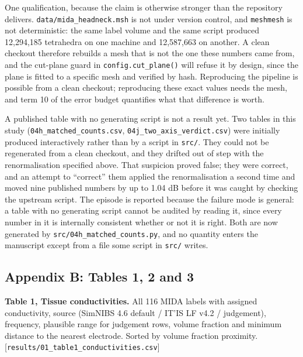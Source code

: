 \documentclass[manuscript,review,anonymous]{acmart}
\begin{document}
One qualification, because the claim is otherwise stronger than the repository
delivers. \texttt{data/mida\_headneck.msh} is not under version control, and \texttt{meshmesh}
is not deterministic: the same label volume and the same script produced
12,294,185 tetrahedra on one machine and 12,587,663 on another. A clean checkout
therefore rebuilds a mesh that is not the one these numbers came from, and the
cut-plane guard in \texttt{config.cut\_plane()} will refuse it by design, since the
plane is fitted to a specific mesh and verified by hash. Reproducing the
pipeline is possible from a clean checkout; reproducing these exact values needs
the mesh, and term 10 of the error budget quantifies what that difference is
worth.

A published table with no generating script is not a result yet. Two tables in
this study (\texttt{04h\_matched\_counts.csv}, \texttt{04j\_two\_axis\_verdict.csv}) were initially
produced interactively rather than by a script in \texttt{src/}. They could not be
regenerated from a clean checkout, and they drifted out of step with the
renormalisation specified above. That suspicion proved false; they were correct,
and an attempt to ``correct'' them applied the renormalisation a second time and
moved nine published numbers by up to 1.04 dB before it was caught by checking
the upstream script. The episode is reported because the failure mode is
general: a table with no generating script cannot be audited by reading it,
since every number in it is internally consistent whether or not it is right.
Both are now generated by \texttt{src/04h\_matched\_counts.py}, and no quantity enters
the manuscript except from a file some script in \texttt{src/} writes.

\subsection{Appendix B: Tables 1, 2 and 3}\label{appendix-b-tables-1-2-and-3}

\textbf{Table 1, Tissue conductivities.} All 116 MIDA labels with assigned
conductivity, source (SimNIBS 4.6 default / IT'IS LF v4.2 / judgement),
frequency, plausible range for judgement rows, volume fraction and minimum
distance to the nearest electrode. Sorted by volume fraction \texttimes{} proximity.
{[}\texttt{results/01\_table1\_conductivities.csv}{]}
\end{document}
